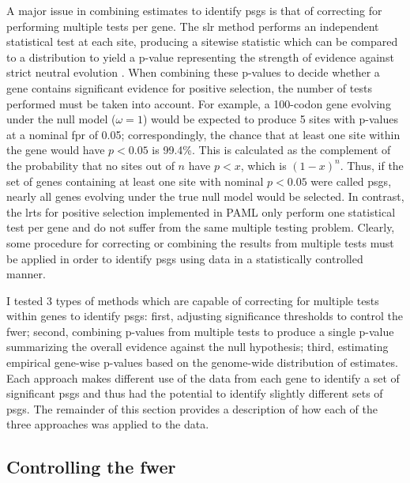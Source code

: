 A major issue in combining \sw estimates to identify \acp{psg} is that
of correcting for performing multiple \sw tests per gene. The \ac{slr}
method performs an independent statistical test at each site,
producing a sitewise statistic which can be compared to a \chisq
distribution to yield a p-value representing the strength of evidence
against strict neutral evolution \citep{Massingham2005}. When
combining these p-values to decide whether a gene contains significant
evidence for positive selection, the number of tests performed must be
taken into account. For example, a 100-codon gene evolving under the
null model ($\omega=1$) would be expected to produce 5 sites with
p-values at a nominal \ac{fpr} of 0.05; correspondingly, the chance
that at least one site within the gene would have $p<0.05$ is
99.4\%. This is calculated as the complement of the probability that
no sites out of $n$ have $p<x$, which is $(1-x)^{n}$. Thus, if the set
of genes containing at least one site with nominal $p<0.05$ were
called \acp{psg}, nearly all genes evolving under the true null model
would be selected. In contrast, the \ac{lrt}s for positive selection
implemented in PAML only perform one statistical test per gene and do
not suffer from the same multiple testing problem. Clearly, some
procedure for correcting or combining the results from multiple tests
must be applied in order to identify \acp{psg} using \sw data in a
statistically controlled manner.

I tested 3 types of methods which are capable of correcting for
multiple \sw tests within genes to identify \acp{psg}: first,
adjusting significance thresholds to control the \ac{fwer}; second,
combining p-values from multiple tests to produce a single p-value
summarizing the overall evidence against the null hypothesis; third,
estimating empirical gene-wise p-values based on the genome-wide
distribution of \sw estimates. Each approach makes different use of
the \sw data from each gene to identify a set of significant \acp{psg}
and thus had the potential to identify slightly different sets of
\acp{psg}. The remainder of this section provides a description of how
each of the three approaches was applied to the \sw data.

\subsection{Controlling the \ac{fwer}}

